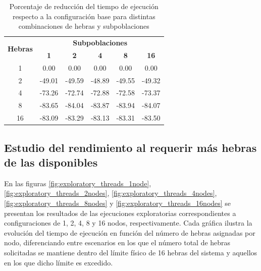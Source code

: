 \begin{table}[ht]
    \centering
    \begin{tabular}{|c|ccccc|}
        \hline
        \multirow{2}{*}{\textbf{Hebras}} & \multicolumn{5}{c|}{\textbf{Subpoblaciones}}                                                      \\ \cline{2-6}
                                         & \textbf{1}                                   & \textbf{2} & \textbf{4} & \textbf{8} & \textbf{16} \\ \hline
        1                                & 0.00                                         & 0.00       & 0.00       & 0.00       & 0.00        \\ \hline
        2                                & -49.01                                       & -49.59     & -48.89     & -49.55     & -49.32      \\ \hline
        4                                & -73.26                                       & -72.74     & -72.88     & -72.58     & -73.37      \\ \hline
        8                                & -83.65                                       & -84.04     & -83.87     & -83.94     & -84.07      \\ \hline
        16                               & -83.09                                       & -83.29     & -83.13     & -83.31     & -83.50      \\ \hline
    \end{tabular}
    \caption{Porcentaje de reducción del tiempo de ejecución respecto a la configuración base para distintas combinaciones de hebras y subpoblaciones}
    \label{tab:exploratory_populations_delta}
\end{table}

\subsection{Estudio del rendimiento al requerir más hebras de las disponibles}

En las figuras \ref{fig:exploratory_threads_1node}, \ref{fig:exploratory_threads_2nodes}, \ref{fig:exploratory_threads_4nodes}, \ref{fig:exploratory_threads_8nodes} y \ref{fig:exploratory_threads_16nodes} se presentan los resultados de las ejecuciones exploratorias correspondientes a configuraciones de 1, 2, 4, 8 y 16 nodos, respectivamente. Cada gráfica ilustra la evolución del tiempo de ejecución en función del número de hebras asignadas por nodo, diferenciando entre escenarios en los que el número total de hebras solicitadas se mantiene dentro del límite físico de 16 hebras del sistema y aquellos en los que dicho límite es excedido.

